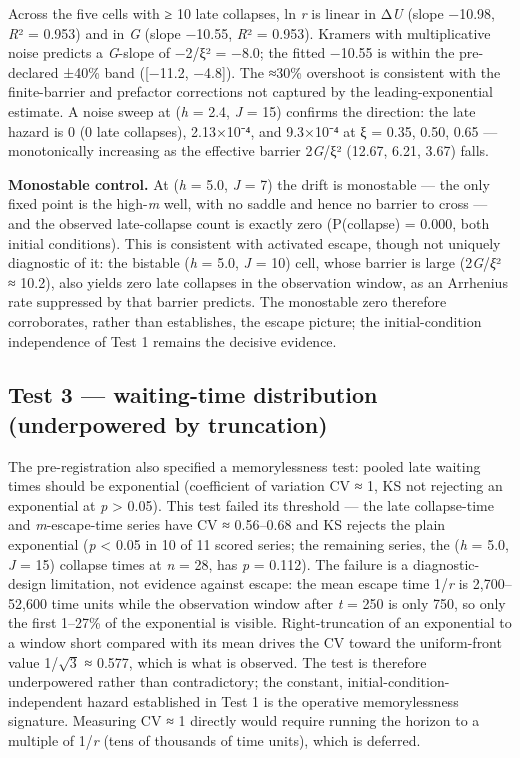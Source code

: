 \documentclass[11pt,letterpaper]{article}
\begin{document}
Across the five cells with ≥ 10 late collapses, ln \emph{r} is linear in Δ\emph{U} (slope −10.98, \emph{R}² = 0.953) and in \emph{G} (slope −10.55, \emph{R}² = 0.953). Kramers with multiplicative noise predicts a \emph{G}-slope of −2/ξ² = −8.0; the fitted −10.55 is within the pre-declared ±40\% band ({[}−11.2, −4.8{]}). The ≈30\% overshoot is consistent with the finite-barrier and prefactor corrections not captured by the leading-exponential estimate. A noise sweep at (\emph{h} = 2.4, \emph{J} = 15) confirms the direction: the late hazard is 0 (0 late collapses), 2.13×10⁻⁴, and 9.3×10⁻⁴ at ξ = 0.35, 0.50, 0.65 --- monotonically increasing as the effective barrier 2\emph{G}/ξ² (12.67, 6.21, 3.67) falls.

\textbf{Monostable control.} At (\emph{h} = 5.0, \emph{J} = 7) the drift is monostable --- the only fixed point is the high-\emph{m} well, with no saddle and hence no barrier to cross --- and the observed late-collapse count is exactly zero (P(collapse) = 0.000, both initial conditions). This is consistent with activated escape, though not uniquely diagnostic of it: the bistable (\emph{h} = 5.0, \emph{J} = 10) cell, whose barrier is large (2\emph{G}/\emph{ξ}² ≈ 10.2), also yields zero late collapses in the observation window, as an Arrhenius rate suppressed by that barrier predicts. The monostable zero therefore corroborates, rather than establishes, the escape picture; the initial-condition independence of Test 1 remains the decisive evidence.

\subsection{Test 3 --- waiting-time distribution (underpowered by truncation)}\label{test-3-waiting-time-distribution-underpowered-by-truncation}

The pre-registration also specified a memorylessness test: pooled late waiting times should be exponential (coefficient of variation CV ≈ 1, KS not rejecting an exponential at \emph{p} \textgreater{} 0.05). This test failed its threshold --- the late collapse-time and \emph{m}-escape-time series have CV ≈ 0.56--0.68 and KS rejects the plain exponential (\emph{p} \textless{} 0.05 in 10 of 11 scored series; the remaining series, the (\emph{h} = 5.0, \emph{J} = 15) collapse times at \emph{n} = 28, has \emph{p} = 0.112). The failure is a diagnostic-design limitation, not evidence against escape: the mean escape time 1/\emph{r} is 2,700--52,600 time units while the observation window after \emph{t} = 250 is only 750, so only the first 1--27\% of the exponential is visible. Right-truncation of an exponential to a window short compared with its mean drives the CV toward the uniform-front value 1/\(\sqrt{3}\) ≈ 0.577, which is what is observed. The test is therefore underpowered rather than contradictory; the constant, initial-condition-independent hazard established in Test 1 is the operative memorylessness signature. Measuring CV ≈ 1 directly would require running the horizon to a multiple of 1/\emph{r} (tens of thousands of time units), which is deferred.




\end{document}
